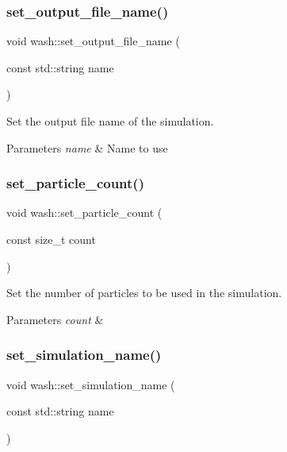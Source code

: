 \subsubsection{\texorpdfstring{set\+\_\+output\+\_\+file\+\_\+name()}{set\_output\_file\_name()}}
{\footnotesize\ttfamily void wash\+::set\+\_\+output\+\_\+file\+\_\+name (\begin{DoxyParamCaption}\item[{const std\+::string}]{name }\end{DoxyParamCaption})}



Set the output file name of the simulation. 


\begin{DoxyParams}{Parameters}
{\em name} & Name to use \\
\hline
\end{DoxyParams}
\mbox{\label{namespacewash_a20a6940ce5a881482fe472ed704f177e}} 
\subsubsection{\texorpdfstring{set\+\_\+particle\+\_\+count()}{set\_particle\_count()}}
{\footnotesize\ttfamily void wash\+::set\+\_\+particle\+\_\+count (\begin{DoxyParamCaption}\item[{const size\+\_\+t}]{count }\end{DoxyParamCaption})}



Set the number of particles to be used in the simulation. 


\begin{DoxyParams}{Parameters}
{\em count} & \\
\hline
\end{DoxyParams}
\mbox{\label{namespacewash_a4ddbab848bef96e0fc69bf8e280d4775}} 
\subsubsection{\texorpdfstring{set\+\_\+simulation\+\_\+name()}{set\_simulation\_name()}}
{\footnotesize\ttfamily void wash\+::set\+\_\+simulation\+\_\+name (\begin{DoxyParamCaption}\item[{const std\+::string}]{name }\end{DoxyParamCaption})}



